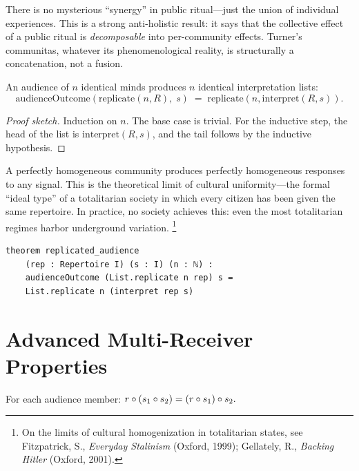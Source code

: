 There is no mysterious ``synergy'' in public ritual---just the union of
individual experiences.  This is a strong anti-holistic result: it says that
the collective effect of a public ritual is \emph{decomposable} into
per-community effects.  Turner's communitas, whatever its phenomenological
reality, is structurally a concatenation, not a fusion.

\begin{theorem}
\label{thm:replicated-audience}
An audience of $n$ identical minds produces $n$ identical interpretation lists:
\[
  \mathrm{audienceOutcome}(\mathrm{replicate}(n, R),\; s)
  \;=\;
  \mathrm{replicate}(n, \mathrm{interpret}(R, s)).
\]
\end{theorem}

\begin{proof}[Proof sketch]
Induction on $n$.  The base case is trivial.  For the inductive step, the
head of the list is $\mathrm{interpret}(R,s)$, and the tail follows by the
inductive hypothesis.
\end{proof}

A perfectly homogeneous community produces perfectly homogeneous responses
to any signal.  This is the theoretical limit of cultural uniformity---the
formal ``ideal type'' of a totalitarian society in which every citizen has
been given the same repertoire.  In practice, no society achieves this: even
the most totalitarian regimes harbor underground variation.%
\footnote{On the limits of cultural homogenization in totalitarian states,
see Fitzpatrick, S., \textit{Everyday Stalinism} (Oxford, 1999);
Gellately, R., \textit{Backing Hitler} (Oxford, 2001).}

\begin{lstlisting}[caption={Replicated audience in Lean~4.}]
theorem replicated_audience
    (rep : Repertoire I) (s : I) (n : ℕ) :
    audienceOutcome (List.replicate n rep) s =
    List.replicate n (interpret rep s)
\end{lstlisting}


\section{Advanced Multi-Receiver Properties}
\label{sec:mr-advanced}

\begin{theorem}
\label{thm:sequential-audience}
For each audience member:
$r\circ(s_1\circ s_2) = (r\circ s_1)\circ s_2.$
\end{theorem}

